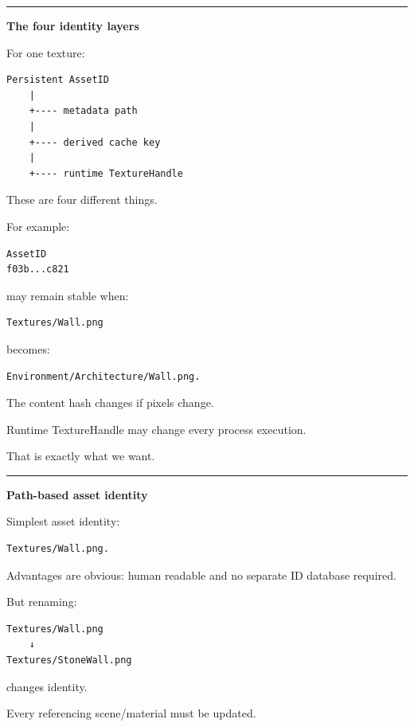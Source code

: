\begin{center}\rule{0.5\linewidth}{0.5pt}\end{center}

\textbf{The four identity layers}

For one texture:

\begin{verbatim}
Persistent AssetID
    |
    +---- metadata path
    |
    +---- derived cache key
    |
    +---- runtime TextureHandle
\end{verbatim}

These are four different things.

For example:

\begin{verbatim}
AssetID
f03b...c821
\end{verbatim}

may remain stable when:

\begin{verbatim}
Textures/Wall.png
\end{verbatim}

becomes:

\begin{verbatim}
Environment/Architecture/Wall.png.
\end{verbatim}

The content hash changes if pixels change.

Runtime TextureHandle may change every process execution.

That is exactly what we want.

\begin{center}\rule{0.5\linewidth}{0.5pt}\end{center}

\textbf{Path-based asset identity}

Simplest asset identity:

\begin{verbatim}
Textures/Wall.png.
\end{verbatim}

Advantages are obvious: human readable and no separate ID database required.

But renaming:

\begin{verbatim}
Textures/Wall.png
    ↓
Textures/StoneWall.png
\end{verbatim}

changes identity.

Every referencing scene/material must be updated.

